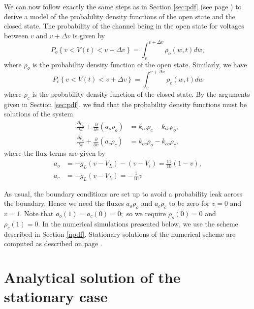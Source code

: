 We can now follow exactly the same steps as in Section \ref{sec:pdf} (see page
\pageref{sec:pdf}) to derive a model of the probability density
functions of the open state and the closed state. The probability of the
channel being in the open state for voltages between $v$ and $v+\Delta v$ is
given by%
\[
P_{o}\left\{  v<V(t)<v+\Delta v\right\}  =\int_{v}^{v+\Delta v}\rho_{o}(w,t)dw,
\]
where $\rho_{o}$ is the probability density function of the open state.
Similarly, we have%
\[
P_{c}\left\{  v<V(t)<v+\Delta v\right\}  =\int_{v}^{v+\Delta v}\rho_{c}(w,t)dw
\]
where $\rho_{c}$ is the probability density function of the closed state. By
the arguments given in Section \ref{sec:pdf}, we find that the probability
density functions must be solutions of the system%
\begin{align}
\frac{\partial\rho_{o}}{\partial t}+\frac{\partial}{\partial v}\left(
a_{o}\rho_{o}\right)   &  =k_{co}\rho_{c}-k_{oc}\rho_{o},\label{vpdf}\\
\frac{\partial\rho_{c}}{\partial t}+\frac{\partial}{\partial v}\left(
a_{c}\rho_{c}\right)   &  =k_{oc}\rho_{o}-k_{co}\rho_{c},\nonumber
\end{align}
where the flux terms are given by
\begin{align}
a_{o} &  =-g_{L}\left(  v-V_{L}\right)  -(v-V_{i})=\frac{11}{10}\left(
1-v\right)  ,\label{vflux}\\
a_{c} &  =-g_{L}\left(  v-V_{L}\right)  =-\frac{1}{10}v\nonumber
\end{align}


As usual, the boundary conditions are set up to avoid a probability leak
across the boundary. Hence we need the  fluxes $a_{o}\rho_{o}$ and
$a_{c}\rho_{c}$ to be zero for $v=0$ and $v=1.$ Note that $a_{o}%
(1)=a_{c}(0)=0;$ so we require $\rho_{o}(0)=0$ and $\rho_{c}(1)=0.$ In
the numerical simulations presented below, we use the scheme described in
Section \ref{npdf}. Stationary solutions of the numerical scheme are computed
as described on page \pageref{accuracy}.


\section{Analytical solution of the stationary case}

